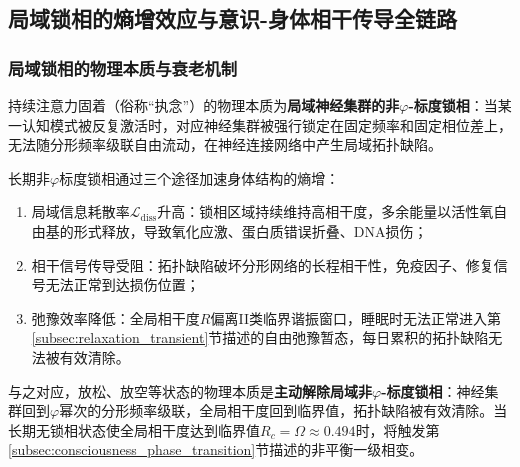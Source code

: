 \documentclass[12pt,a4paper,twocolumn]{article}
\renewcommand{\phi}{\varphi}
\begin{document}
\subsection{局域锁相的熵增效应与意识-身体相干传导全链路}
\label{subsec:coherence_link}

\subsubsection{局域锁相的物理本质与衰老机制}
持续注意力固着（俗称``执念''）的物理本质为\textbf{局域神经集群的非$\phi$-标度锁相}：当某一认知模式被反复激活时，对应神经集群被强行锁定在固定频率和固定相位差上，无法随分形频率级联自由流动，在神经连接网络中产生局域拓扑缺陷。

长期非$\phi$标度锁相通过三个途径加速身体结构的熵增：
\begin{enumerate}
\item 局域信息耗散率$\mathcal{L}_{\text{diss}}$升高：锁相区域持续维持高相干度，多余能量以活性氧自由基的形式释放，导致氧化应激、蛋白质错误折叠、DNA损伤；
\item 相干信号传导受阻：拓扑缺陷破坏分形网络的长程相干性，免疫因子、修复信号无法正常到达损伤位置；
\item 弛豫效率降低：全局相干度$R$偏离II类临界谐振窗口，睡眠时无法正常进入第\ref{subsec:relaxation_transient}节描述的自由弛豫暂态，每日累积的拓扑缺陷无法被有效清除。
\end{enumerate}

与之对应，放松、放空等状态的物理本质是\textbf{主动解除局域非$\phi$-标度锁相}：神经集群回到$\phi$幂次的分形频率级联，全局相干度回到临界值，拓扑缺陷被有效清除。当长期无锁相状态使全局相干度达到临界值$R_c=\Omega\approx0.494$时，将触发第\ref{subsec:consciousness_phase_transition}节描述的非平衡一级相变。
\end{document}

